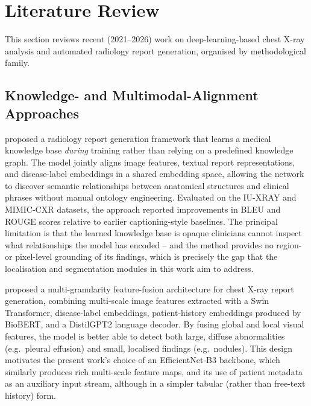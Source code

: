 \documentclass[preprint,12pt,authoryear]{elsarticle}
\begin{document}
\section{Literature Review}
\label{sec:litreview}

This section reviews recent (2021--2026) work on deep-learning-based chest X-ray analysis and automated radiology report generation, organised by methodological family.

\subsection{Knowledge- and Multimodal-Alignment Approaches}

\citet{yang_knowledge} proposed a radiology report generation framework that learns a medical knowledge base \emph{during} training rather than relying on a predefined knowledge graph. The model jointly aligns image features, textual report representations, and disease-label embeddings in a shared embedding space, allowing the network to discover semantic relationships between anatomical structures and clinical phrases without manual ontology engineering. Evaluated on the IU-XRAY and MIMIC-CXR datasets, the approach reported improvements in BLEU and ROUGE scores relative to earlier captioning-style baselines. The principal limitation is that the learned knowledge base is opaque clinicians cannot inspect what relationships the model has encoded -- and the method provides no region- or pixel-level grounding of its findings, which is precisely the gap that the localisation and segmentation modules in this work aim to address.

\citet{mmg_fusion} proposed a multi-granularity feature-fusion architecture for chest X-ray report generation, combining multi-scale image features extracted with a Swin Transformer, disease-label embeddings, patient-history embeddings produced by BioBERT, and a DistilGPT2 language decoder. By fusing global and local visual features, the model is better able to detect both large, diffuse abnormalities (e.g.\ pleural effusion) and small, localised findings (e.g.\ nodules). This design motivates the present work's choice of an EfficientNet-B3 backbone, which similarly produces rich multi-scale feature maps, and its use of patient metadata as an auxiliary input stream, although in a simpler tabular (rather than free-text history) form.
\end{document}
